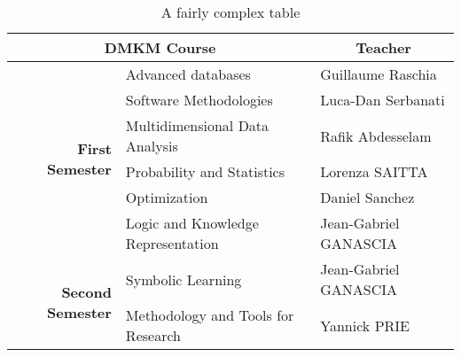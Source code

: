 \documentclass{article}
\begin{document}
\begin{table}

\caption{A fairly complex table}
\label{exercice_3.2}


\begin{tabular}{|r|l|l|}

\hline
\multicolumn{2}{|c|}{\bf DMKM Course} &  \multicolumn{1}{|c|}{\bf Teacher}
\\
\hline

\multirow{6}{*}{ \bf First Semester} & Advanced databases  & Guillaume Raschia
\\
\cline{2-3}
&Software Methodologies & Luca-Dan Serbanati
\\
\cline{2-3}
&Multidimensional Data Analysis & Rafik Abdesselam
\\
\cline{2-3}
&Probability and Statistics & Lorenza SAITTA
\\
\cline{2-3}
&Optimization & Daniel Sanchez
\\
\cline{2-3}
&Logic and Knowledge Representation & Jean-Gabriel GANASCIA
\\
\hline



\multirow{2}{*}{ \bf Second Semester} & Symbolic Learning  & Jean-Gabriel GANASCIA
\\
\cline{2-3}
&Methodology and Tools for Research & Yannick PRIE
\\
\hline


\end{tabular}

\end{table}
\end{document}
